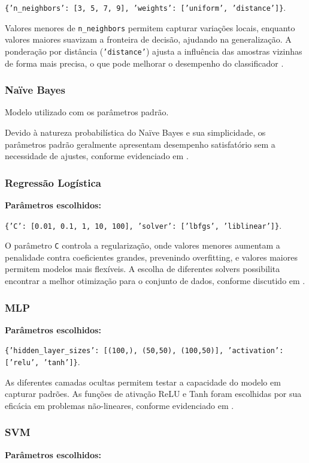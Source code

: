 \documentclass[conference]{IEEEtran}
\begin{document}
\texttt{\{'n\_neighbors': [3, 5, 7, 9], 'weights': ['uniform', 'distance']\}}.  

Valores menores de \texttt{n\_neighbors} permitem capturar variações locais, enquanto valores maiores suavizam a fronteira de decisão, ajudando na generalização. A ponderação por distância (\texttt{'distance'}) ajusta a influência das amostras vizinhas de forma mais precisa, o que pode melhorar o desempenho do classificador \cite{ref:knn}.

\subsubsection{Naïve Bayes}
Modelo utilizado com os parâmetros padrão.  

Devido à natureza probabilística do Naïve Bayes e sua simplicidade, os parâmetros padrão geralmente apresentam desempenho satisfatório sem a necessidade de ajustes, conforme evidenciado em \cite{ref:NB}.

\subsubsection{Regressão Logística}
\textbf{Parâmetros escolhidos:} 

\texttt{\{'C': [0.01, 0.1, 1, 10, 100], 'solver': ['lbfgs', 'liblinear']\}}.  
 
O parâmetro \texttt{C} controla a regularização, onde valores menores aumentam a penalidade contra coeficientes grandes, prevenindo overfitting, e valores maiores permitem modelos mais flexíveis. A escolha de diferentes solvers possibilita encontrar a melhor otimização para o conjunto de dados, conforme discutido em \cite{ref:logistic}.

\subsubsection{MLP}
\textbf{Parâmetros escolhidos:} 

\texttt{\{'hidden\_layer\_sizes': [(100,), (50,50), (100,50)], 'activation': ['relu', 'tanh']\}}.  
 
As diferentes camadas ocultas permitem testar a capacidade do modelo em capturar padrões. As funções de ativação ReLU e Tanh foram escolhidas por sua eficácia em problemas não-lineares, conforme evidenciado em \cite{ref:mlp}.

\subsubsection{SVM}
\textbf{Parâmetros escolhidos:} 
\end{document}

